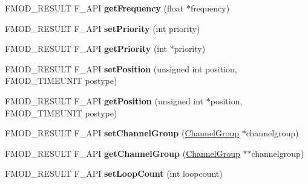 \begin{DoxyCompactItemize}
\mbox{\label{classFMOD_1_1Channel_a99f1dcf4b2a67f509d08f138e9e3cbca}} 
F\+M\+O\+D\+\_\+\+R\+E\+S\+U\+LT F\+\_\+\+A\+PI {\bfseries get\+Frequency} (float $\ast$frequency)
\item 
\mbox{\label{classFMOD_1_1Channel_a83a9a2f49e4bdde446f0d574847f5329}} 
F\+M\+O\+D\+\_\+\+R\+E\+S\+U\+LT F\+\_\+\+A\+PI {\bfseries set\+Priority} (int priority)
\item 
\mbox{\label{classFMOD_1_1Channel_ae2a16710e706c0223937bc99fb3cad3d}} 
F\+M\+O\+D\+\_\+\+R\+E\+S\+U\+LT F\+\_\+\+A\+PI {\bfseries get\+Priority} (int $\ast$priority)
\item 
\mbox{\label{classFMOD_1_1Channel_a46f8f6738b500bbb995bd4a4ecce826f}} 
F\+M\+O\+D\+\_\+\+R\+E\+S\+U\+LT F\+\_\+\+A\+PI {\bfseries set\+Position} (unsigned int position, F\+M\+O\+D\+\_\+\+T\+I\+M\+E\+U\+N\+IT postype)
\item 
\mbox{\label{classFMOD_1_1Channel_a580cb740f80cf139faaf21181490d98f}} 
F\+M\+O\+D\+\_\+\+R\+E\+S\+U\+LT F\+\_\+\+A\+PI {\bfseries get\+Position} (unsigned int $\ast$position, F\+M\+O\+D\+\_\+\+T\+I\+M\+E\+U\+N\+IT postype)
\item 
\mbox{\label{classFMOD_1_1Channel_a570b83eb8178325a131b081a8d5ffd81}} 
F\+M\+O\+D\+\_\+\+R\+E\+S\+U\+LT F\+\_\+\+A\+PI {\bfseries set\+Channel\+Group} (\hyperlink{classFMOD_1_1ChannelGroup}{Channel\+Group} $\ast$channelgroup)
\item 
\mbox{\label{classFMOD_1_1Channel_a4b6d310d04eb844190db7a4074af2b2c}} 
F\+M\+O\+D\+\_\+\+R\+E\+S\+U\+LT F\+\_\+\+A\+PI {\bfseries get\+Channel\+Group} (\hyperlink{classFMOD_1_1ChannelGroup}{Channel\+Group} $\ast$$\ast$channelgroup)
\item 
\mbox{\label{classFMOD_1_1Channel_a7dc161cf3a929cd48da580634059f6a6}} 
F\+M\+O\+D\+\_\+\+R\+E\+S\+U\+LT F\+\_\+\+A\+PI {\bfseries set\+Loop\+Count} (int loopcount)
\item 
\mbox{\label{classFMOD_1_1Channel_a23128bf2475ef316e1c38a3606ccbfd0}} 
$$
\end{DoxyCompactItemize}
